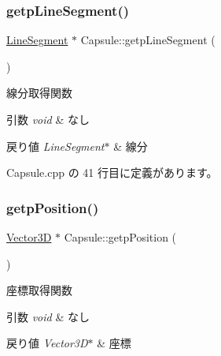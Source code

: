 \mbox{\label{class_capsule_aadd6a7e5e20796e3f591b83cc406070e}} 
\subsubsection{\texorpdfstring{getp\+Line\+Segment()}{getpLineSegment()}}
{\footnotesize\ttfamily \mbox{\hyperlink{class_line_segment}{Line\+Segment}} $\ast$ Capsule\+::getp\+Line\+Segment (\begin{DoxyParamCaption}{ }\end{DoxyParamCaption})}



線分取得関数 


\begin{DoxyParams}{引数}
{\em void} & なし \\
\hline
\end{DoxyParams}

\begin{DoxyRetVals}{戻り値}
{\em Line\+Segment$\ast$} & 線分 \\
\hline
\end{DoxyRetVals}


 Capsule.\+cpp の 41 行目に定義があります。

\mbox{\label{class_capsule_ab0f3be95228fef65ef04d444aa5bcddd}} 
\subsubsection{\texorpdfstring{getp\+Position()}{getpPosition()}}
{\footnotesize\ttfamily \mbox{\hyperlink{class_vector3_d}{Vector3D}} $\ast$ Capsule\+::getp\+Position (\begin{DoxyParamCaption}{ }\end{DoxyParamCaption})}



座標取得関数 


\begin{DoxyParams}{引数}
{\em void} & なし \\
\hline
\end{DoxyParams}

\begin{DoxyRetVals}{戻り値}
{\em Vector3\+D$\ast$} & 座標 \\
\hline
\end{DoxyRetVals}


